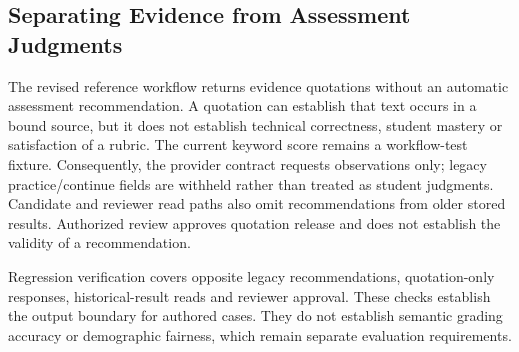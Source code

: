 \subsection{Separating Evidence from Assessment Judgments}
The revised reference workflow returns evidence quotations without an automatic assessment recommendation. A quotation can establish that text occurs in a bound source, but it does not establish technical correctness, student mastery or satisfaction of a rubric. The current keyword score remains a workflow-test fixture. Consequently, the provider contract requests observations only; legacy practice/continue fields are withheld rather than treated as student judgments. Candidate and reviewer read paths also omit recommendations from older stored results. Authorized review approves quotation release and does not establish the validity of a recommendation.

Regression verification covers opposite legacy recommendations, quotation-only responses, historical-result reads and reviewer approval. These checks establish the output boundary for authored cases. They do not establish semantic grading accuracy or demographic fairness, which remain separate evaluation requirements.
